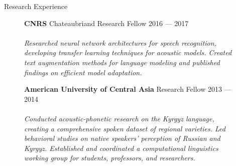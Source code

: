 \documentclass{cv} %
\begin{document}
\begin{rSection}{Research Experience}
  \begin{figure}[H]
    \begin{minipage}{0.2\textwidth}
      \centering
      
    \end{minipage}
    \begin{minipage}{0.8\textwidth}
      {\bf CNRS} \hfill Chateaubriand Research Fellow \hspace{0.5cm} {2016 --- 2017} \\ \\
      \textit{Researched neural network architectures for speech recognition, developing transfer learning techniques for acoustic models. Created text augmentation methods for language modeling and published findings on efficient model adaptation.}
    \end{minipage}
  \end{figure}

  \begin{figure}[H]
    \begin{minipage}{0.2\textwidth}
      \centering
      
    \end{minipage}
    \begin{minipage}{0.8\textwidth}
      {\bf American University of Central Asia} \hfill Research Fellow \hspace{0.5cm} {2013 --- 2014} \\ \\
      \textit{Conducted acoustic-phonetic research on the Kyrgyz language, creating a comprehensive spoken dataset of regional varieties. Led behavioral studies on native speakers' perception of Russian and Kyrgyz. Established and coordinated a computational linguistics working group for students, professors, and researchers.}
    \end{minipage}
  \end{figure}

\end{rSection}
\end{document}
